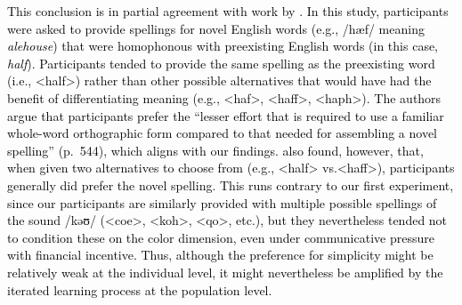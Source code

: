 \documentclass[doc,biblatex]{apa7}
\newcommand\firstrevision[1]{\textcolor{black}{#1}}
\begin{document}
\firstrevision{This conclusion is in partial agreement with work by \textcite{Treiman:2015}. In this study, participants were asked to provide spellings for novel English words (e.g., /hæf/ meaning \textit{alehouse}) that were homophonous with preexisting English words (in this case, \textit{half}). Participants tended to provide the same spelling as the preexisting word (i.e., <half>) rather than other possible alternatives that would have had the benefit of differentiating meaning (e.g., <haf>, <haff>, <haph>). The authors argue that participants prefer the ``lesser effort that is required to use a familiar whole-word orthographic form compared to that needed for assembling a novel spelling'' (p.~544), which aligns with our findings. \textcite{Treiman:2015} also found, however, that, when given two alternatives to choose from (e.g., <half> vs.\@ <haff>), participants generally did prefer the novel spelling. This runs contrary to our first experiment, since our participants are similarly provided with multiple possible spellings of the sound /kəʊ/ (<coe>, <koh>, <qo>, etc.), but they nevertheless tended not to condition these on the color dimension, even under communicative pressure with financial incentive. Thus, although the preference for simplicity might be relatively weak at the individual level, it might nevertheless be amplified by the iterated learning process at the population level.}
\end{document}
